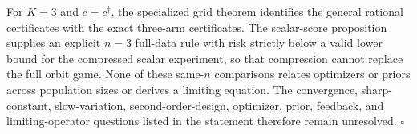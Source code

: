 For \(K=3\) and \(c=c^\dagger\), the specialized grid theorem identifies the general rational certificates with the exact three-arm certificates. The scalar-score proposition supplies an explicit \(n=3\) full-data rule with risk strictly below a valid lower bound for the compressed scalar experiment, so that compression cannot replace the full orbit game. None of these same-\(n\) comparisons relates optimizers or priors across population sizes or derives a limiting equation. The convergence, sharp-constant, slow-variation, second-order-design, optimizer, prior, feedback, and limiting-operator questions listed in the statement therefore remain unresolved. \(\square\)
